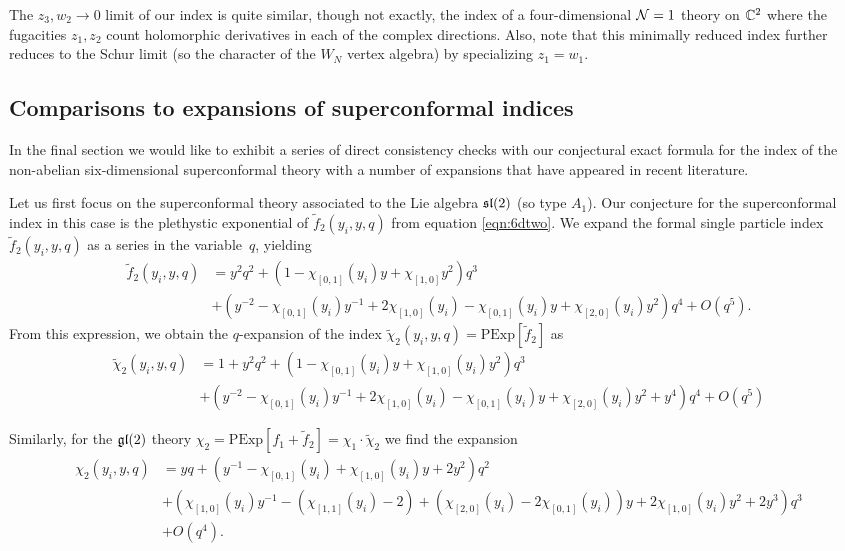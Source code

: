 The $z_3,w_2 \to 0$ limit of our index is quite similar, though not exactly, the index of a four-dimensional $\mathcal{N}=1$ theory on $\mathbb{C}^2$ where the fugacities $z_1,z_2$ count holomorphic derivatives in each of the complex directions.
Also, note that this minimally reduced index further reduces to the Schur limit (so the character of the $W_N$ vertex algebra) by specializing $z_1 = w_1$.

\subsection{Comparisons to expansions of superconformal indices}

In the final section we would like to exhibit a series of direct consistency checks with our conjectural exact formula for the index of the non-abelian six-dimensional superconformal theory with a number of expansions that have appeared in recent literature. 

\parsec
Let us first focus on the superconformal theory associated to the Lie algebra $\mathfrak{sl}(2)$ (so type $A_1$).
Our conjecture for the superconformal index in this case is the plethystic exponential of $\tilde f_2 (y_i,y,q)$ from equation \eqref{eqn:6dtwo}.
We expand the formal single particle index $\tilde f_2 (y_i, y, q)$ as a series in the variable~$q$, yielding
\begin{align*}
\tilde f_2 (y_i,y,q) & = y^2 q^2 + \left(1 - \chi_{[0,1]}(y_i) y + \chi_{[1,0]} y^2 \right) q^3 \\
& + \left(y^{-2} - \chi_{[0,1]}(y_i) y^{-1} + 2 \chi_{[1,0]}(y_i) - \chi_{[0,1]} (y_i) y + \chi_{[2,0]}(y_i) y^2 \right) q^4 + O(q^5) .
\end{align*}
From this expression, we obtain the $q$-expansion of the index $\tilde \chi_2(y_i,y,q) = \text{PExp}[\tilde f_2]$ as 
\begin{align*}
\tilde \chi_2(y_i,y,q) & = 1 + y^2 q^2 + \left(1-\chi_{[0,1]}(y_i) y + \chi_{[1,0]}(y_i)y^2\right)q^3 \\ 
& + \left(y^{-2} - \chi_{[0,1]}(y_i) y^{-1} + 2 \chi_{[1,0]}(y_i) - \chi_{[0,1]} (y_i) y + \chi_{[2,0]}(y_i) y^2 + y^4\right)q^4 + O(q^5)
\end{align*}

Similarly, for the $\mathfrak{gl}(2)$ theory $\chi_2 = \text{PExp}[f_1 + \tilde f_2] = \chi_1 \cdot \tilde \chi_2$ we find the expansion
\begin{align*}
\chi_2 (y_i,y,q) & = y q + \left(y^{-1} - \chi_{[0,1]}(y_i) + \chi_{[1,0]}(y_i) y + 2y^2 \right) q^2 \\ 
& + \left( \chi_{[1,0]}(y_i) y^{-1} - (\chi_{[1,1]}(y_i)-2) + (\chi_{[2,0]}(y_i) - 2 \chi_{[0,1]}(y_i)) y + 2 \chi_{[1,0]}(y_i) y^2 + 2y^3\right) q^3 \\ & + O(q^4) .
\end{align*}

